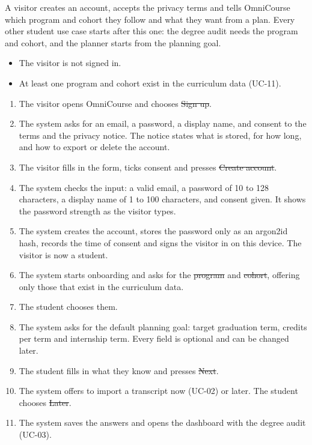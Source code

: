 

A visitor creates an account, accepts the privacy terms and tells OmniCourse which program and cohort they follow and
what they want from a plan. Every other student use case starts after this one: the degree audit needs the program and
cohort, and the planner starts from the planning goal.

\begin{itemize}
  \item The visitor is not signed in.
  \item At least one program and cohort exist in the curriculum data (UC-11).
\end{itemize}

\begin{enumerate}
  \item The visitor opens OmniCourse and chooses \st{Sign up}.
  \item The system asks for an email, a password, a display name, and consent to the terms and the privacy notice. The
        notice states what is stored, for how long, and how to export or delete the account.
  \item The visitor fills in the form, ticks consent and presses \st{Create account}.
  \item The system checks the input: a valid email, a password of 10 to 128 characters, a display name of 1 to 100
        characters, and consent given. It shows the password strength as the visitor types.
  \item The system creates the account, stores the password only as an argon2id hash, records the time of consent and
        signs the visitor in on this device. The visitor is now a student.
  \item The system starts onboarding and asks for the \st{program} and \st{cohort}, offering only those that exist in the
        curriculum data.
  \item The student chooses them.
  \item The system asks for the default planning goal: target graduation term, credits per term and internship term.
        Every field is optional and can be changed later.
  \item The student fills in what they know and presses \st{Next}.
  \item The system offers to import a transcript now (UC-02) or later. The student chooses \st{Later}.
  \item The system saves the answers and opens the dashboard with the degree audit (UC-03).
\end{enumerate}

